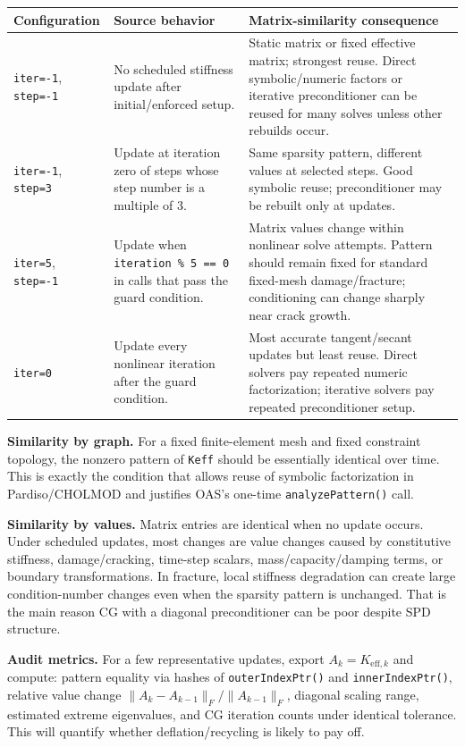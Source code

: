 \documentclass[10pt,a4paper]{article}
\newcommand{\code}[1]{\texttt{#1}}
\begin{document}
\begin{table}[h]
\small
\centering
\begin{tabularx}{\textwidth}{L{0.25\textwidth} L{0.26\textwidth} Y}
\toprule
Configuration & Source behavior & Matrix-similarity consequence \\
\midrule
\code{iter=-1}, \code{step=-1} & No scheduled stiffness update after initial/enforced setup. & Static matrix or fixed effective matrix; strongest reuse. Direct symbolic/numeric factors or iterative preconditioner can be reused for many solves unless other rebuilds occur. \\
\code{iter=-1}, \code{step=3} & Update at iteration zero of steps whose step number is a multiple of 3. & Same sparsity pattern, different values at selected steps. Good symbolic reuse; preconditioner may be rebuilt only at updates. \\
\code{iter=5}, \code{step=-1} & Update when \code{iteration \% 5 == 0} in calls that pass the guard condition. & Matrix values change within nonlinear solve attempts. Pattern should remain fixed for standard fixed-mesh damage/fracture; conditioning can change sharply near crack growth. \\
\code{iter=0} & Update every nonlinear iteration after the guard condition. & Most accurate tangent/secant updates but least reuse. Direct solvers pay repeated numeric factorization; iterative solvers pay repeated preconditioner setup. \\
\bottomrule
\end{tabularx}
\end{table}

\textbf{Similarity by graph.} For a fixed finite-element mesh and fixed constraint topology, the nonzero pattern of \code{Keff} should be essentially identical over time. This is exactly the condition that allows reuse of symbolic factorization in Pardiso/CHOLMOD and justifies OAS's one-time \code{analyzePattern()} call.

\textbf{Similarity by values.} Matrix entries are identical when no update occurs. Under scheduled updates, most changes are value changes caused by constitutive stiffness, damage/cracking, time-step scalars, mass/capacity/damping terms, or boundary transformations. In fracture, local stiffness degradation can create large condition-number changes even when the sparsity pattern is unchanged. That is the main reason CG with a diagonal preconditioner can be poor despite SPD structure.

\textbf{Audit metrics.} For a few representative updates, export \(A_k=K_{\mathrm{eff},k}\) and compute: pattern equality via hashes of \code{outerIndexPtr()} and \code{innerIndexPtr()}, relative value change \(\lVert A_k-A_{k-1}\rVert_F/\lVert A_{k-1}\rVert_F\), diagonal scaling range, estimated extreme eigenvalues, and CG iteration counts under identical tolerance. This will quantify whether deflation/recycling is likely to pay off.
\end{document}
